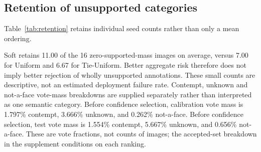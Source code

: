 \subsection{Retention of unsupported categories}
Table~\ref{tab:retention} retains individual seed counts rather than only a mean ordering.

Soft retains 11.00 of the 16 zero-supported-mass images on average, versus 7.00 for Uniform and 6.67 for Tie-Uniform. Better aggregate risk therefore does not imply better rejection of wholly unsupported annotations. These small counts are descriptive, not an estimated deployment failure rate. Contempt, unknown and not-a-face vote-mass breakdowns are supplied separately rather than interpreted as one semantic category.
Before confidence selection, calibration vote mass is 1.797\% contempt, 3.666\% unknown, and 0.262\% not-a-face. Before confidence selection, test vote mass is 1.554\% contempt, 5.667\% unknown, and 0.656\% not-a-face. These are vote fractions, not counts of images; the accepted-set breakdown in the supplement conditions on each ranking.
